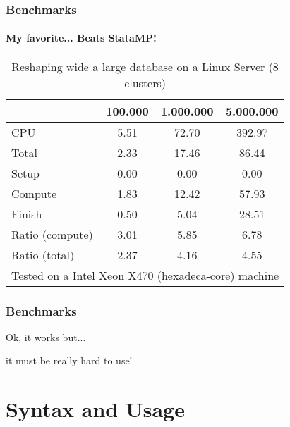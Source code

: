 \documentclass[11pt, handout]{beamer}
\def\unix1{Intel Xeon X470 (hexadeca-core)}
\begin{document}
\begin{frame}
\frametitle{Benchmarks}
\framesubtitle{My favorite... Beats StataMP!}

\begin{table}[!h]
\centering
\caption{Reshaping wide a large database on a Linux Server (8 clusters)}
\begin{tabular}{l*{3}{c}}\hline
& 100.000 &         1.000.000 &         5.000.000 \\ \hline
CPU &     5.51 &     72.70 &    392.97 \\
Total &     2.33 &     17.46 &     86.44 \\
\hspace{2mm} Setup &     0.00 &      0.00 &      0.00 \\
\hspace{2mm} Compute &     1.83 &     12.42 &     57.93 \\
\hspace{2mm} Finish &     0.50 &      5.04 &     28.51 \\
\hline Ratio (compute) &     3.01 &      5.85 &      6.78 \\
Ratio (total) &     2.37 &      4.16 &      4.55 \\
\hline
\multicolumn{4}{l}{\footnotesize Tested on a \unix1 machine}
\end{tabular}
\end{table}

\end{frame}

\begin{frame}
\frametitle{Benchmarks}
{\Large Ok, it works but...}\pause 

{\Huge it must be really hard to use!}
\end{frame}

\section{Syntax and Usage}

\frame{\tableofcontents[currentsection]}
\end{document}
